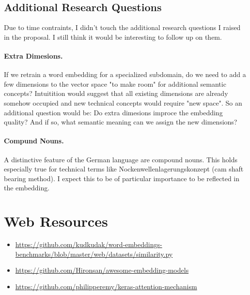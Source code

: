 \documentclass[10pt,a4paper]{article}
\begin{document}
	\subsection{Additional Research Questions}
	Due to time contraints, I didn't touch the additional research questions I raised in the proposal. I still think it would be interesting to follow up on them. 
	\paragraph{Extra Dimesions.} If we retrain a word embedding for a specialized subdomain, do we need to add a few dimensions to the vector space "to make room" for additional semantic concepts? Intuitition would suggest that all existing dimensions are already somehow occupied and new technical concepts would require "new space". So an additional question would be: Do extra dimesions improce the embedding quality? And if so, what semantic meaning can we assign the new dimensions? 
	\paragraph{Compund Nouns.} A distinctive feature of the German language are compound nouns. This holds especially true for technical terms like Nockenwellenlagerungskonzept (cam shaft bearing method). I expect this to be of particular importance to be reflected in the embedding. 
	


\section*{Web Resources}
\label{web_resources}
\begin{itemize}
	\item \url{https://github.com/kudkudak/word-embeddings-benchmarks/blob/master/web/datasets/similarity.py}
	\item \url{https://github.com/Hironsan/awesome-embedding-models}
	\item \url{https://github.com/philipperemy/keras-attention-mechanism}
\end{itemize}



\nocite{*}




	
	
\end{document}
